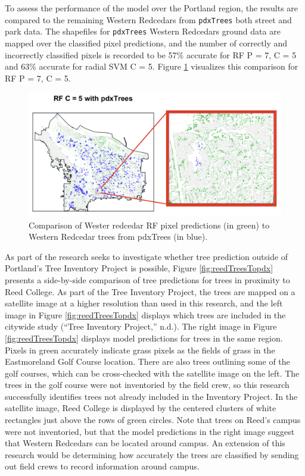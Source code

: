 \documentclass[12pt,twoside]{reedthesis}
\begin{document}
To assess the performance of the model over the Portland region, the results are compared to the remaining Western Redcedars from \texttt{pdxTrees} both street and park data. The shapefiles for \texttt{pdxTrees} Western Redcedars ground data are mapped over the classified pixel predictions, and the number of correctly and incorrectly classified pixels is recorded to be 57\% accurate for RF P = 7, C = 5 and 63\% accurate for radial SVM C = 5. Figure \ref{fig:resultsToStreet} visualizes this comparison for RF P = 7, C = 5.
\begin{figure}

{\centering \includegraphics[width=1\linewidth]{figure/resultsToStreet} 

}

\caption{Comparison of Wester redcedar RF pixel predictions (in green) to Western Redcedar trees from pdxTrees (in blue).}\label{fig:resultsToStreet}
\end{figure}
As part of the research seeks to investigate whether tree prediction outside of Portland's Tree Inventory Project is possible, Figure \ref{fig:reedTreesTopdx} presents a side-by-side comparison of tree predictions for trees in proximity to Reed College. As part of the Tree Inventory Project, the trees are mapped on a satellite image at a higher resolution than used in this research, and the left image in Figure \ref{fig:reedTreesTopdx} displays which trees are included in the citywide study (``Tree Inventory Project,'' n.d.). The right image in Figure \ref{fig:reedTreesTopdx} displays model predictions for trees in the same region. Pixels in green accurately indicate grass pixels as the fields of grass in the Eastmoreland Golf Course location. There are also trees outlining some of the golf courses, which can be cross-checked with the satellite image on the left. The trees in the golf course were not inventoried by the field crew, so this research successfully identifies trees not already included in the Inventory Project. In the satellite image, Reed College is displayed by the centered clusters of white rectangles just above the rows of green circles. Note that trees on Reed's campus were not inventoried, but that the model predictions in the right image suggest that Western Redcedars can be located around campus. An extension of this research would be determining how accurately the trees are classified by sending out field crews to record information around campus.
\end{document}
